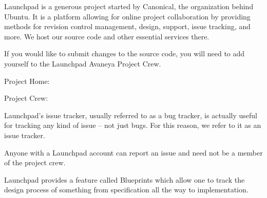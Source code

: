 

Launchpad is a generous project started by Canonical, the organization behind Ubuntu. It is a platform allowing for online project collaboration by providing methods for revision control management, design, support, issue tracking, and more. We host our source code and other essential services there.

If you would like to submit changes to the source code, you will need to add yourself to the Launchpad Avaneya Project Crew.

\blank[2*big]
\startnarrower[3*left]
Project Home:\crlf
{}

\blank[2*big]
Project Crew:\crlf
{}
\stopnarrower

Launchpad's issue tracker, usually referred to as a bug tracker, is actually useful for tracking any kind of issue -- not just bugs. For this reason, we refer to it as an issue tracker.

Anyone with a Launchpad account can report an issue and need not be a member of the project crew.

\startnarrower[3*left]
\stopnarrower

Launchpad provides a feature called Blueprints which allow one to track the design process of something from specification all the way to implementation.











